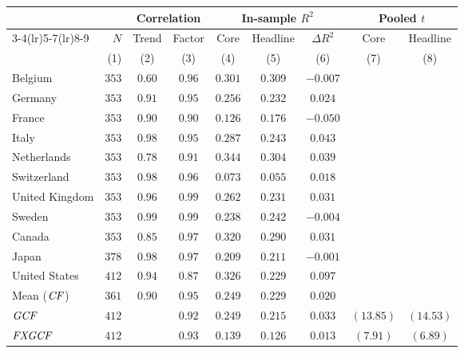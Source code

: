 \small
\setlength{\tabcolsep}{4pt}
\begin{tabular}{l r cc ccc cc}
  \toprule
  & & \multicolumn{2}{c}{Correlation} & \multicolumn{3}{c}{In-sample $R^{2}$}
    & \multicolumn{2}{c}{Pooled $t$} \\
  \cmidrule(lr){3-4}\cmidrule(lr){5-7}\cmidrule(lr){8-9}
  & $N$ & Trend & Factor & Core & Headline & $\Delta R^{2}$ & Core & Headline \\
  & (1) & (2) & (3) & (4) & (5) & (6) & (7) & (8) \\
  \midrule
  Belgium        & $353$ & $0.60$ & $0.96$ & $0.301$ & $0.309$ & $-0.007$ & & \\
  Germany        & $353$ & $0.91$ & $0.95$ & $0.256$ & $0.232$ & $0.024$  & & \\
  France         & $353$ & $0.90$ & $0.90$ & $0.126$ & $0.176$ & $-0.050$ & & \\
  Italy          & $353$ & $0.98$ & $0.95$ & $0.287$ & $0.243$ & $0.043$  & & \\
  Netherlands    & $353$ & $0.78$ & $0.91$ & $0.344$ & $0.304$ & $0.039$  & & \\
  Switzerland    & $353$ & $0.98$ & $0.96$ & $0.073$ & $0.055$ & $0.018$  & & \\
  United Kingdom & $353$ & $0.96$ & $0.99$ & $0.262$ & $0.231$ & $0.031$  & & \\
  Sweden         & $353$ & $0.99$ & $0.99$ & $0.238$ & $0.242$ & $-0.004$ & & \\
  Canada         & $353$ & $0.85$ & $0.97$ & $0.320$ & $0.290$ & $0.031$  & & \\
  Japan          & $378$ & $0.98$ & $0.97$ & $0.209$ & $0.211$ & $-0.001$ & & \\
  United States  & $412$ & $0.94$ & $0.87$ & $0.326$ & $0.229$ & $0.097$  & & \\
  \midrule
  Mean ($\mathit{CF}$)   & $361$ & $0.90$ & $0.95$ & $0.249$ & $0.229$ & $0.020$  & & \\
  $\mathit{GCF}$         & $412$ &        & $0.92$ & $0.249$ & $0.215$ & $0.033$  & $(13.85)$ & $(14.53)$ \\
  $\mathit{FXGCF}$       & $412$ &        & $0.93$ & $0.139$ & $0.126$ & $0.013$  & $(7.91)$  & $(6.89)$  \\
  \bottomrule
\end{tabular}
